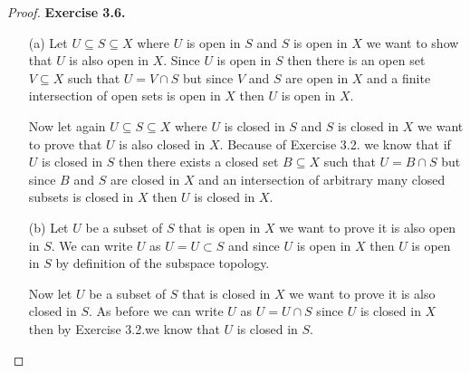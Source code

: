 \documentclass[11pt]{article}
\theoremstyle{definition}
\begin{document}
\begin{proof}{\textbf{Exercise 3.6.}}
\begin{itemize}
    \item [(a)] Let $U \subseteq S \subseteq X$ where $U$ is open in $S$ and
    $S$ is open in $X$ we want to show that $U$ is also open in $X$.
    Since $U$ is open in $S$ then there is an open set $V \subseteq X$ such that
    $U = V \cap S$ but since $V$ and $S$ are open in $X$ and a finite
    intersection of open sets is open in $X$ then $U$ is open in $X$.

    Now let again $U \subseteq S \subseteq X$ where $U$ is closed in $S$
    and $S$ is closed in $X$ we want to prove that $U$ is also closed in $X$.
    Because of Exercise 3.2. we know that if $U$ is closed in $S$
    then there exists a closed set $B \subseteq X$ such that $U = B \cap S$
    but since $B$ and $S$ are closed in $X$ and an intersection of arbitrary
    many closed subsets is closed in $X$ then $U$ is closed in $X$.

    \item [(b)] Let $U$ be a subset of $S$ that is open in $X$
    we want to prove it is also open in $S$.
    We can write $U$ as $U = U \subset S$ and since $U$ is open in $X$ then
    $U$ is open in $S$ by definition of the subspace topology.

    Now let $U$ be a subset of $S$ that is closed in $X$ we want to prove it
    is also closed in $S$. As before we can write $U$ as $U = U \cap S$ since
    $U$ is closed in $X$ then by Exercise 3.2.we know that $U$ is closed in $S$.

\end{itemize}
\end{proof}
\end{document}
